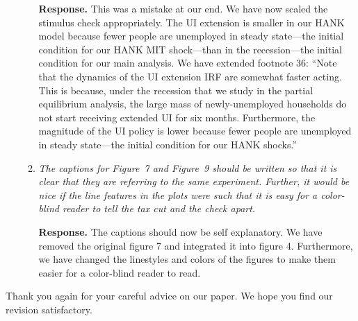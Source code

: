 \documentclass[12pt,letterpaper,english]{article}
\begin{document}
\begin{itemize}
\begin{enumerate}[start=2]
		\noindent \textbf{Response.} This was a mistake at our end. We have now scaled the stimulus check appropriately. The UI extension is smaller in our HANK model because fewer people are unemployed in steady state---the initial condition for our HANK MIT shock---than in the recession---the initial condition for our main analysis. We have extended footnote 36: ``Note that the dynamics of the UI extension IRF are somewhat faster acting.
		This is because, under the recession that we study in the partial equilibrium analysis, the large mass of newly-unemployed households do not start receiving extended UI for six months. Furthermore, the magnitude of the UI policy is lower because fewer people are unemployed in steady state---the initial condition for our HANK shocks.'' 
		
		\item \textit{The captions for Figure~7 and Figure~9 should be written so that it is clear that they are referring to the same experiment. Further, it would be nice if the line features in the plots were such that it is easy for a color-blind reader to tell the tax cut and the check apart.}
		
		\noindent \textbf{Response.}  	The captions should now be self explanatory. We have removed the original figure 7 and integrated it into figure 4. Furthermore, we have changed the linestyles and colors of the figures to make them easier for a color-blind reader to read.
			
	\end{enumerate}
	

	
\end{itemize}

	
	\bigskip
	
	\noindent Thank you again for your careful advice on our paper. We hope you find our revision satisfactory.
	


\end{document}
